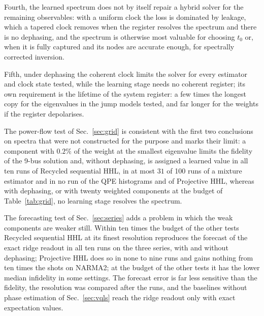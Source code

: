 \documentclass[journal]{IEEEtran}
\begin{document}
Fourth, the learned spectrum does not by itself repair a hybrid solver for the remaining observables: with a uniform clock the loss is dominated by leakage, which a tapered clock removes when the register resolves the spectrum and there is no dephasing, and the spectrum is otherwise most valuable for choosing $t_0$ or, when it is fully captured and its nodes are accurate enough, for spectrally corrected inversion.

Fifth, under dephasing the coherent clock limits the solver for every estimator and clock state tested, while the learning stage needs no coherent register; its own requirement is the lifetime of the system register: a few times the longest copy for the eigenvalues in the jump models tested, and far longer for the weights if the register depolarises.

The power-flow test of Sec.~\ref{sec:grid} is consistent with the first two conclusions on spectra that were not constructed for the purpose and marks their limit: a component with $0.2\%$ of the weight at the smallest eigenvalue limits the fidelity of the 9-bus solution and, without dephasing, is assigned a learned value in all ten runs of Recycled sequential HHL, in at most $31$ of 100 runs of a mixture estimator and in no run of the QPE histograms and of Projective HHL, whereas with dephasing, or with twenty weighted components at the budget of Table~\ref{tab:grid}, no learning stage resolves the spectrum.

The forecasting test of Sec.~\ref{sec:series} adds a problem in which the weak components are weaker still. Within ten times the budget of the other tests Recycled sequential HHL at its finest resolution reproduces the forecast of the exact ridge readout in all ten runs on the three series, with and without dephasing; Projective HHL does so in none to nine runs and gains nothing from ten times the shots on NARMA2; at the budget of the other tests it has the lower median infidelity in some settings. The forecast error is far less sensitive than the fidelity, the resolution was compared after the runs, and the baselines without phase estimation of Sec.~\ref{sec:vqls} reach the ridge readout only with exact expectation values.
\end{document}
